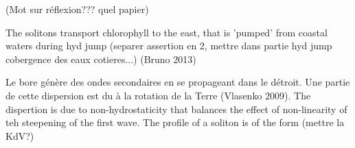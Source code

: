 (Mot sur réflexion??? quel papier)

The solitons transport chlorophyll to the east, that is 'pumped' from coastal waters during hyd jump (separer assertion en 2, mettre dans partie hyd jump cobergence des eaux cotieres...) (Bruno 2013)

Le bore génère des ondes secondaires en se propageant dans le détroit. Une partie de cette dispersion est du à la rotation de la Terre (Vlasenko 2009). The dispertion is due to non-hydrostaticity that balances the effect of non-linearity of teh steepening of the first wave. The profile of a soliton is of the form (mettre la KdV?)
















